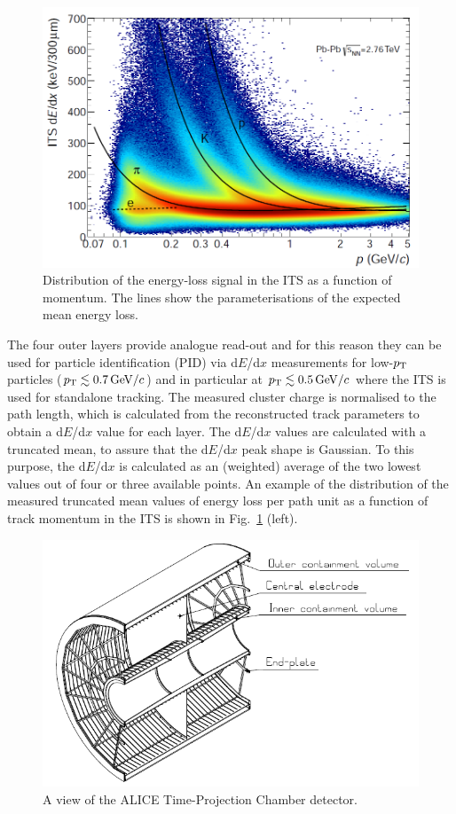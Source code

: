  \begin{figure}[!h]
\centering
\includegraphics[width=.65\textwidth]{FigCap3/ITSpid.png}
\caption{Distribution of the energy-loss signal in the ITS as a function of momentum. The lines show the parameterisations of the expected mean energy loss.}
\label{fig:imagePIDITS}
\end{figure}

 The four outer layers provide analogue read-out and for this reason they 
 can be used for particle identification (PID) via d$E$/d$x$ measurements for 
 low-$p_{\rm T}$ particles ($p_{\rm T} \lesssim 0.7 \, \mathrm{GeV}/c$) and in particular at $p_{\rm T}\lesssim 0.5 \, \mathrm{GeV}/c$
 where the ITS is used for standalone tracking. The measured cluster charge is normalised to the path length, 
 which is calculated from the reconstructed track parameters to obtain a d$E$/d$x$ 
 value for each layer. The d$E$/d$x$ values are calculated with a truncated mean, to assure that
 the d$E$/d$x$ peak shape is Gaussian. To this purpose, the d$E$/d$x$ is calculated as an 
 (weighted) average of the two lowest values out of four or three available points. 
 An example of the distribution of the measured truncated mean values of energy loss 
 per path unit as a function of track momentum in the ITS is shown 
 in Fig.~\ref{fig:imagePIDITS} (left). 
 \begin{figure}[!h]
\centering
\includegraphics[width=.6\textwidth]{FigCap3/TPC.png}
\caption{A view of the ALICE Time-Projection Chamber detector.}
\label{fig:imageTPC}
\end{figure}

